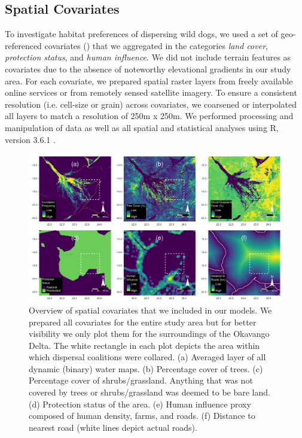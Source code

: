 \documentclass[abstract=on,10pt,a4paper,bibliography=totocnumbered]{article}
\begin{document}
\subsection{Spatial Covariates}
To investigate habitat preferences of dispersing wild dogs, we used a set of
geo-referenced covariates () that we aggregated in the
categories \textit{land cover}, \textit{protection status}, and \textit{human
influence}. We did not include terrain features as covariates due to the absence
of noteworthy elevational gradients in our study area. For each covariate, we
prepared spatial raster layers from freely available online services or from
remotely sensed satellite imagery. To ensure a consistent resolution (i.e.
cell-size or grain) across covariates, we coarsened or interpolated all layers
to match a resolution of 250m x 250m. We performed processing and manipulation
of data as well as all spatial and statistical analyses using R, version 3.6.1
\citep{R.2019}.

\begin{figure}[h]
  \begin{center}
    \includegraphics[width = \textwidth]{99_Covariates.pdf}
    \caption{Overview of spatial covariates that we included in our models. We
    prepared all covariates for the entire study area but for better visibility
    we only plot them for the surroundings of the Okavango Delta. The white
    rectangle in each plot depicts the area within which dispersal coalitions
    were collared. (a) Averaged layer of all dynamic (binary) water maps. (b)
    Percentage cover of trees. (c) Percentage cover of shrubs/grassland.
    Anything that was not covered by trees or shrubs/grassland was deemed to be
    bare land. (d) Protection status of the area. (e) Human influence proxy
    composed of human density, farms, and roads. (f) Distance to nearest road
    (white lines depict actual roads).}
    \label{Covariates}
  \end{center}
\end{figure}
\end{document}
